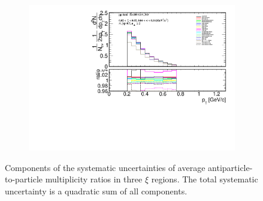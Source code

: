 \begin{figure}[t!]
\begin{subfigure}{.49\textwidth}
		\end{subfigure}
		\begin{subfigure}{.49\textwidth}
			\includegraphics[width=\textwidth,page=39]{chapters/chrgSTAR/img/syst/outPID_SDT_ratio.pdf}
		\end{subfigure}
		\begin{minipage}{.49\textwidth}
			\caption[Components of the systematic uncertainties of average antiparticle-to-particle multiplicity ratios  in three $\xi$ regions]{Components of the systematic uncertainties of average antiparticle-to-particle multiplicity ratios  in three $\xi$ regions. The total  systematic uncertainty is a quadratic sum of all  components.}
			\label{fig:results_star_syst_xi_part}
		\end{minipage}
\end{figure}

\captionsetup{format=default,indention=0pt,justification=justified}
\FloatBarrier